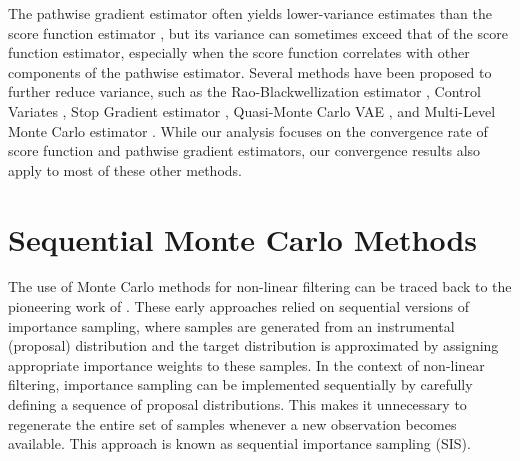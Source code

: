 \documentclass[english,graybox,envcountchap,envcountsame,sectrefs,shortlabels]{svmono}
\theoremstyle{style}
\begin{document}
The pathwise gradient estimator often yields lower-variance estimates than the score function estimator \cite{miller2017reducing, buchholz2018quasi}, but its variance can sometimes exceed that of the score function estimator, especially when the score function correlates with other components of the pathwise estimator.
Several methods have been proposed to further reduce variance, such as the Rao-Blackwellization estimator \cite{ranganath2014black}, Control Variates \cite{lievin2020optimal}, Stop Gradient estimator \cite{roeder2017sticking}, Quasi-Monte Carlo VAE \cite{buchholz2018quasi}, and Multi-Level Monte Carlo estimator \cite{fujisawa2021multilevel, he2022unbiased}. While our analysis focuses on the convergence rate of score function and pathwise gradient estimators, our convergence results also apply to most of these other methods.




\chapter{Sequential Monte Carlo Methods}
\label{chap:smc}
The use of Monte Carlo methods for non-linear filtering can be traced back to the pioneering work of \cite{HandschinMayne1969}. These early approaches relied on sequential versions of importance sampling, where samples are generated from an instrumental (proposal) distribution and the target distribution is approximated by assigning appropriate importance weights to these samples. In the context of non-linear filtering, importance sampling can be implemented sequentially by carefully defining a sequence of proposal distributions. This makes it unnecessary to regenerate the entire set of samples whenever a new observation becomes available. This approach is known as sequential importance sampling (SIS).
\end{document}

